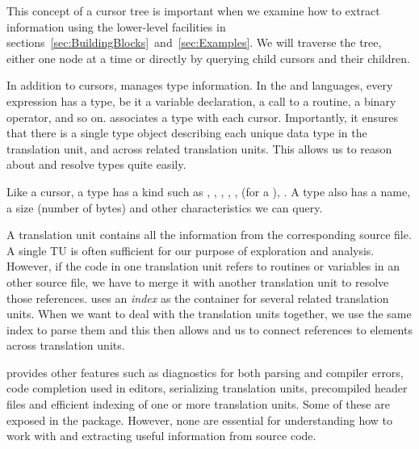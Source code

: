 This concept of a cursor tree is important when we examine how to
extract information using the lower-level facilities in
sections~\ref{sec:BuildingBlocks}~and~\ref{sec:Examples}.  We will traverse
the tree, either one node at a time or directly by querying child
cursors and their children.

In addition to cursors, \libclang{} manages type information.  In the
\C{} and \Cpp{} languages, every expression has a type, be it a
variable declaration, a call to a routine, a binary operator, and so on.  \libclang{}
associates a type with each cursor.  Importantly, it ensures that
there is a single type object describing each unique data type in the
translation unit, and across related translation units.  This allows
us to reason about and resolve types quite easily.

Like a cursor, a \libclang{} type has a kind such as ,
, ,
, ,
 (for a ),
.  A type also has a name, a size (number of
bytes) and other characteristics we can query.


A translation unit contains all the information from the corresponding
source file.  A single TU is often sufficient for our purpose of
exploration and analysis. However, if the code in one translation unit
refers to routines or variables in an other source file, we have to
merge it with another translation unit to resolve those references.
\libclang{} uses an \textit{index} as the container for several
related translation units.  When we want to deal with the translation
units together, we use the same index to parse them and this then
allows \libclang{} and us to connect references to elements across
translation units.


\libclang{} provides other features such as diagnostics for both parsing
and compiler errors, code completion used in editors, serializing
translation units, precompiled header files and efficient indexing of
one or more translation units.  Some of these are exposed in the 
package. However, none are essential for understanding how to work
with \libclang{} and extracting useful information from source code.




